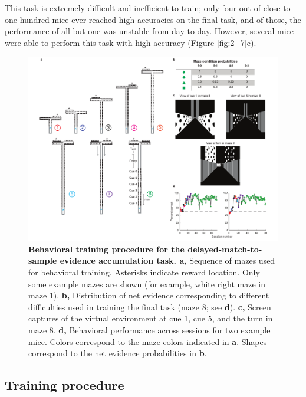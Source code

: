 \bigskip
This task is extremely difficult and inefficient to train; only four out of close to one hundred mice ever reached high accuracies on the final task, and of those, the performance of all but one was unstable from day to day. However, several mice were able to perform this task with high accuracy (Figure \ref{fig:2_7}c).    

\begin{figure}
\includegraphics[width=\textwidth]{figures/fig_2_8.pdf}
\caption[Behavioral training procedure for the delayed-match-to-sample evidence accumulation task]{\textbf{Behavioral training procedure for the delayed-match-to-sample evidence accumulation task. a,}
Sequence of mazes used for behavioral training. Asterisks indicate reward location. Only some example mazes are shown (for example, white right maze in maze 1). 
%
\textbf{b,} Distribution of net evidence corresponding to different difficulties used in training the final task (maze 8; see \textbf{d}). 
%
\textbf{c,} Screen captures of the virtual environment at cue 1, cue 5, and the turn in maze 8. 
%
\textbf{d,} Behavioral performance across sessions for two example mice. Colors correspond to the maze colors indicated in \textbf{a}. Shapes correspond to the net evidence probabilities in \textbf{b}.
\label{fig:2_8}}
\end{figure}

\subsection{Training procedure} \label{sec:dms_int_train}


